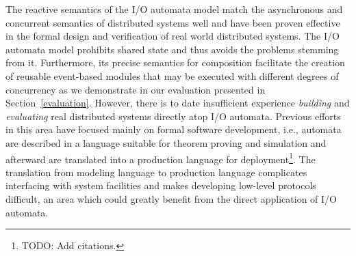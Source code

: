 
The reactive semantics of the I/O automata model match the asynchronous and concurrent semantics of distributed systems well and have been proven effective in the formal design and verification of real world distributed systems.
The I/O automata model prohibits shared state and thus avoids the problems stemming from it.
Furthermore, its precise semantics for composition facilitate the creation of reusable event-based modules that may be executed with different degrees of concurrency as we demonstrate in our evaluation presented in Section~\ref{evaluation}.
However, there is to date insufficient experience \emph{building} and \emph{evaluating} real distributed systems directly atop I/O automata.
Previous efforts in this area have focused mainly on formal software development, i.e., automata are described in a language suitable for theorem proving and simulation and afterward are translated into a production language for deployment\footnote{TODO:  Add citations.}.
The translation from modeling language to production language complicates interfacing with system facilities and makes developing low-level protocols difficult, an area which could greatly benefit from the direct application of I/O automata.

